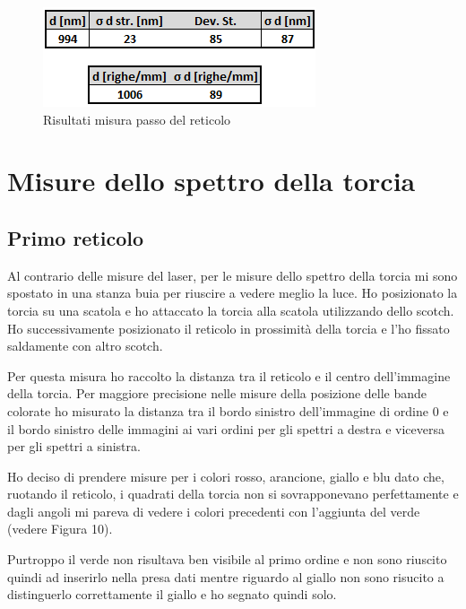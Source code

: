 \documentclass{article}
\begin{document}
\begin{figure}[h!]
  \centering
  \includegraphics[width=0.4\linewidth]{IM risultati laser 2}
  \caption{Risultati misura passo del reticolo}
\end{figure}




\pagebreak
\section{Misure dello spettro della torcia}
\subsection{Primo reticolo}
Al contrario delle misure del laser, per le misure dello spettro della torcia mi sono spostato in una stanza buia per riuscire a vedere meglio la luce. Ho posizionato la torcia su una scatola e ho attaccato la torcia alla scatola utilizzando dello scotch. Ho successivamente posizionato il reticolo in prossimità della torcia e l'ho fissato saldamente con altro scotch.

\vspace{3mm}

Per questa misura ho raccolto la distanza tra il reticolo e il centro dell'immagine della torcia. Per maggiore precisione nelle misure della posizione delle bande colorate ho misurato la distanza tra il bordo sinistro dell'immagine di ordine 0 e il bordo sinistro delle immagini ai vari ordini per gli spettri a destra e viceversa per gli spettri a sinistra. 

\vspace{3mm}
Ho deciso di prendere misure per i colori rosso, arancione, giallo e blu dato che, ruotando il reticolo, i quadrati della torcia non si sovrapponevano perfettamente e dagli angoli mi pareva di vedere i colori precedenti con l'aggiunta del verde (vedere Figura 10).%
 
\vspace{3mm}

Purtroppo il verde non risultava ben visibile al primo ordine e non sono riuscito quindi ad inserirlo nella presa dati mentre riguardo al giallo non sono risucito a distinguerlo correttamente il giallo e ho segnato quindi solo.
\end{document}
